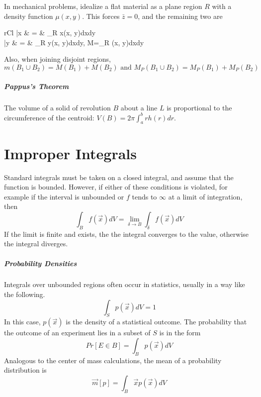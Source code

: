 \documentclass[11pt]{article}
\begin{document}
	In mechanical problems, idealize a flat material as a plane region $R$ with a density function $\mu(x, y)$. This forces $\bar{z}=0$, and the remaining two are
	\begin{IEEEeqnarray}{rCl}
		\bar{x} & = &  \int_R x\mu(x, y)dxdy \\
		\bar{y} & = &  \int_R y\mu(x, y)dxdy, \quad {} M=\int_R \mu(x, y)dxdy
	\end{IEEEeqnarray}
	
	Also, when joining disjoint regions, 
	\begin{equation}
		m(B_1 \cup B_2) = M(B_1) + M(B_2) \text{ and } M_P(B_1 \cup B_2) = M_P(B_1) + M_P(B_2)
	\end{equation}
	
	\subparagraph{Pappus's Theorem} The volume of a solid of revolution $B$ about a line $L$ is proportional to the circumference of the centroid: $V(B) = 2\pi \int_a^b rh(r)dr$.
	
\section{Improper Integrals}
	Standard integrals must be taken on a closed integral, and assume that the function is bounded. However, if either of these conditions is violated, for example if the interval is unbounded or $f$ tends to $\infty$ at a limit of integration, then 
	\begin{equation}
		\int_B f(\vec{x})dV = \lim_{\delta \rightarrow B} \int_{\delta} f(\vec{x})dV
	\end{equation}
	If the limit is finite and exists, the the integral converges to the value, otherwise the integral diverges.
	
	\subparagraph{Probability Densities} Integrals over unbounded regions often occur in statistics, usually in a way like the following.
	\begin{equation}
		\int_S p(\vec{x})dV = 1
	\end{equation}
	In this case, $p(\vec{x})$ is the density of a statistical outcome. The probability that the outcome of an experiment lies in a subset of $S$ is in the form
	\begin{equation}
		Pr[E \in B] = \int_B p(\vec{x})dV
	\end{equation}
	Analogous to the center of mass calculations, the mean of a probability distribution is
	\begin{equation}
		\vec{m}[p] = \int_B \vec{x}p(\vec{x})dV
	\end{equation}
	
\end{document}
